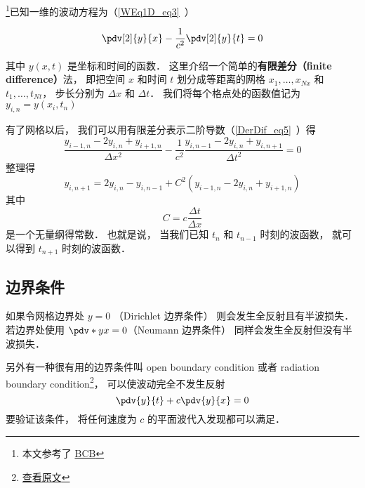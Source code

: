 

\footnote{本文参考了 \href{http://hplgit.github.io/num-methods-for-PDEs/doc/pub/wave/sphinx/._main_wave001.html\#discretizing-the-domain}{BCB}}已知一维的波动方程为（\autoref{WEq1D_eq3}~）

\begin{equation}
\pdv[2]{y}{x} - \frac{1}{c^2}\pdv[2]{y}{t} = 0
\end{equation}

其中 $y(x, t)$ 是坐标和时间的函数． 这里介绍一个简单的\textbf{有限差分（finite difference）}法， 即把空间 $x$ 和时间 $t$ 划分成等距离的网格 $x_1, \dots, x_{Nx}$ 和 $t_1, \dots, t_{Nt}$， 步长分别为 $\Delta x$ 和 $\Delta t$． 我们将每个格点处的函数值记为 $y_{i,n} = y(x_i, t_n)$

有了网格以后， 我们可以用有限差分表示二阶导数（\autoref{DerDif_eq5}~）得
\begin{equation}
\frac{y_{i-1,n} - 2y_{i,n} + y_{i+1,n}}{\Delta x^2} - \frac{1}{c^2} \frac{y_{i, n-1} - 2y_{i, n} + y_{i, n+1}}{\Delta t^2} = 0
\end{equation}
整理得
\begin{equation}
y_{i, n+1} = 2y_{i, n} - y_{i, n-1} + C^2(y_{i-1,n} - 2y_{i,n} + y_{i+1,n})
\end{equation}
其中
\begin{equation}
C = c \frac{\Delta t}{\Delta x}
\end{equation}
是一个无量纲得常数． 也就是说， 当我们已知 $t_n$ 和 $t_{n-1}$ 时刻的波函数， 就可以得到 $t_{n+1}$ 时刻的波函数．

\subsection{边界条件}
如果令网格边界处 $y = 0$ （Dirichlet 边界条件） 则会发生全反射且有半波损失． 若边界处使用 $\pdv*{y}{x} = 0$（Neumann 边界条件） 同样会发生全反射但没有半波损失．

另外有一种很有用的边界条件叫 open boundary condition 或者 radiation boundary condition\footnote{\href{http://hplgit.github.io/num-methods-for-PDEs/doc/pub/wave/sphinx/._main_wave003.html\#problem-11-implement-open-boundary-conditions}{查看原文}}， 可以使波动完全不发生反射
\begin{equation}
\pdv{y}{t} + c\pdv{y}{x} = 0
\end{equation}
要验证该条件， 将任何速度为 $c$ 的平面波代入发现都可以满足．

